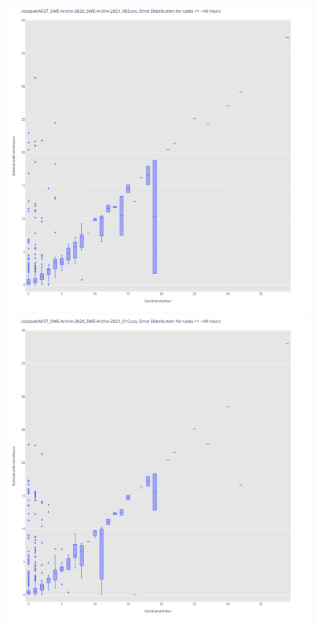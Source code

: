 \includegraphics[width=\textwidth]{Scripts/output/A007_SWE-Archiv-2020_SWE-Archiv-2021_003.csv.error_distribution.png}
\includegraphics[width=\textwidth]{Scripts/output/A007_SWE-Archiv-2020_SWE-Archiv-2021_010.csv.error_distribution.png}
